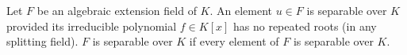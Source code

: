 Let $F$ be an algebraic extension field of $K$. An element $u \in F$ is separable over $K$ provided its irreducible polynomial $f \in K[x]$ has no repeated roots (in any splitting field). $F$ is separable over $K$ if every element of $F$ is separable over $K$.
